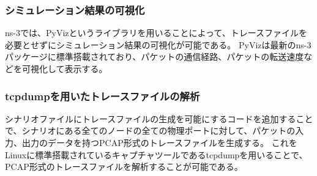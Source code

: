 \subsubsection{シミュレーション結果の可視化}

ns-3では、PyVizというライブラリを用いることによって、トレースファイルを必要とせずにシミュレーション結果の可視化が可能である。
PyVizは最新のns-3パッケージに標準搭載されており、パケットの通信経路、パケットの転送速度などを可視化して表示する。

\subsubsection{tcpdumpを用いたトレースファイルの解析}

シナリオファイルにトレースファイルの生成を可能にするコードを追加することで、シナリオにある全てのノードの全ての物理ポートに対して、パケットの入力、出力のデータを持つPCAP形式のトレースファイルを生成する。
これをLinuxに標準搭載されているキャプチャツールであるtcpdumpを用いることで、PCAP形式のトレースファイルを解析することが可能である。

\subsubsection{}

